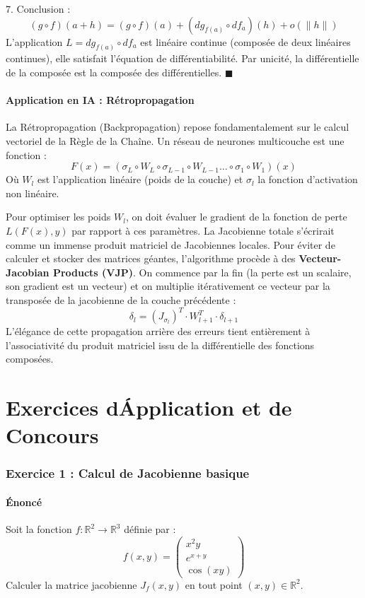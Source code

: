 \documentclass[11pt,a4paper]{article}
\begin{document}
7. Conclusion :
   $$ (g \circ f)(a+h) = (g \circ f)(a) + (dg_{f(a)} \circ df_a)(h) + o(\|h\|) $$
   L'application $L = dg_{f(a)} \circ df_a$ est linéaire continue (composée de deux linéaires continues), elle satisfait l'équation de différentiabilité. Par unicité, la différentielle de la composée est la composée des différentielles. $\blacksquare$

\subsection{Application en IA : Rétropropagation}

La Rétropropagation (Backpropagation) repose fondamentalement sur le calcul vectoriel de la Règle de la Chaîne. Un réseau de neurones multicouche est une fonction :
$$ F(x) = (\sigma_L \circ W_L \circ \sigma_{L-1} \circ W_{L-1} \dots \circ \sigma_1 \circ W_1)(x) $$
Où $W_l$ est l'application linéaire (poids de la couche) et $\sigma_l$ la fonction d'activation non linéaire.

Pour optimiser les poids $W_l$, on doit évaluer le gradient de la fonction de perte $L(F(x), y)$ par rapport à ces paramètres. La Jacobienne totale s'écrirait comme un immense produit matriciel de Jacobiennes locales. Pour éviter de calculer et stocker des matrices géantes, l'algorithme procède à des \textbf{Vecteur-Jacobian Products (VJP)}. On commence par la fin (la perte est un scalaire, son gradient est un vecteur) et on multiplie itérativement ce vecteur par la transposée de la jacobienne de la couche précédente :
$$ \delta_l = \left( J_{\sigma_l} \right)^T \cdot W_{l+1}^T \cdot \delta_{l+1} $$
L'élégance de cette propagation arrière des erreurs tient entièrement à l'associativité du produit matriciel issu de la différentielle des fonctions composées.

\newpage
\part{Exercices d\'Application et de Concours}
\section*{Exercice 1 : Calcul de Jacobienne basique}
\subsection*{Énoncé}
Soit la fonction $f : \mathbb{R}^2 \to \mathbb{R}^3$ définie par :
$$ f(x,y) = \begin{pmatrix} x^2 y \\ e^{x+y} \\ \cos(xy) \end{pmatrix} $$
Calculer la matrice jacobienne $J_f(x,y)$ en tout point $(x,y) \in \mathbb{R}^2$.
\end{document}
